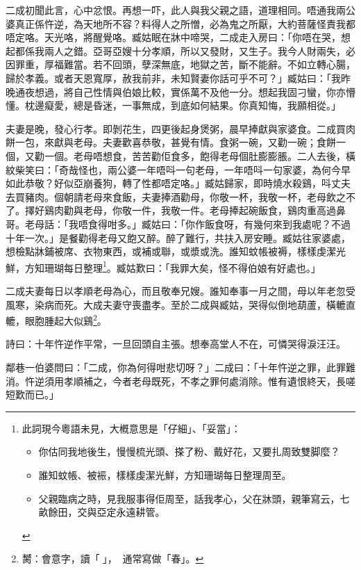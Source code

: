 \documentclass[a5paper, 12pt, openany]{book} %
\begin{document}
	二成初聞此言，心中忿恨。再想一吓，此人與我父親之語，道理相同。唔通我兩公婆真正係忤逆，為天地所不容？料得人之所憎，必為鬼之所厭，大約菩薩怪責我都唔定咯。天光咯，將醒覺咯。臧姑眠在牀中啼哭，二成走入房曰：「你唔在哭，想起都係我兩人之錯。亞哥亞嫂十分孝順，所以又發財，又生子。我今人財兩失，必因罪重，厚福難當。若不回頭，孽深無底，地獄之苦，斷不能辭。不如立轉心腸，歸於孝義。或者天恩寬厚，赦我前非，未知賢妻你話可乎不可？」臧姑曰：「我昨晚通夜想過，將自己性情與伯娘比較，實係萬不及他一分。想起我固刁蠻，你亦懵懂。枕邊癡愛，總是昏迷，一事無成，到底如何結果。你真知悔，我願相從。」

	夫妻是晚，發心行孝。即剝花生，四更後起身煲粥，晨早捧獻與家婆食。二成買肉餅一包，來獻與老母。夫妻歡喜恭敬，甚覺有情。食粥一碗，又勸一碗；食餅一個，又勸一個。老母唔想食，苦苦勸佢食多，飽得老母個肚膨膨脹。二人去後，橫紋柴笑曰：「奇哉怪也，兩公婆一年唔呌一句老母，一年唔呌一句家婆，為何今早如此恭敬？好似亞崩養狗，轉了性都唔定咯。」臧姑歸家，即時燒水殺鷄，呌丈夫去買豬肉。個朝請老母來食飯，夫妻捧酒勸母，你敬一杯，我敬一杯，老母飲之不了。擇好鷄肉勸與老母，你敬一件，我敬一件。老母捧起碗飯食，鷄肉重高過鼻哥。老母話：「我唔食得咁多。」臧姑曰：「你作飯食呀，有幾何來到我處呢？不過十年一次。」是餐勸得老母又飽又醉。醉了難行，共扶入房安睡。臧姑往家婆處，想檢點牀鋪被席、衣物東西，或補或聯，或漿或洗。誰知蚊帳被褥，樣樣虔潔光鮮，方知珊瑚每日整理\footnote{
  此詞現今粵語未見，大槪意思是「仔細」、「妥當」：
  \begin{itemize}[itemsep=0pt, parsep=0pt]
  \item 你估同我地後生，慢慢梳光頭、搽了粉、戴好花，又要扎周致雙脚麼？
  \item 誰知蚊帳、被裖，樣樣虔潔光鮮，方知珊瑚每日整理周至。
  \item 父親臨病之時，見我服事得佢周至，話我孝心，父在牀頭，親筆寫云，七畝餘田，交與亞定永遠耕管。
\end{itemize}

}。臧姑歎曰：「我罪大矣，怪不得伯娘有好處也。」

	二成夫妻每日以孝順老母為心，而且敬奉兄嫂。誰知奉事一月之間，母以年老忽受風寒，染病而死。大成夫妻守喪盡孝。至於二成與臧姑，哭得似倒地葫蘆，橫轆直轆，眼胞腫起大似鷄\footnote{膥：會意字，讀「」，󱛖󱀱通常寫做「春」。}。

	詩曰：十年忤逆作平常，一旦回頭自主張。想奉高堂人不在，可憐哭得淚汪汪。

	鄰巷一伯婆問曰：「二成，你為何得咁悲切呀？」二成曰：「十年忤逆之罪，此罪難消。忤逆須用孝順補之，今者老母既死，不孝之罪何處消除。惟有遺恨終天，長嗟短歎而已。」
\end{document}

